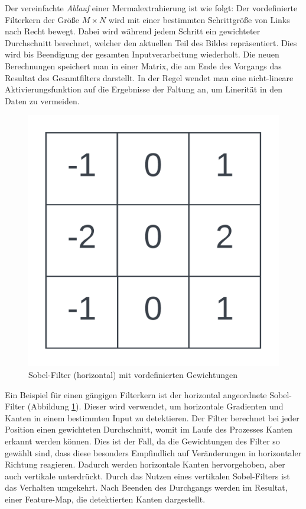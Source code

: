 Der vereinfachte \textit{Ablauf} einer Mermalextrahierung ist wie folgt: Der vordefinierte Filterkern der Größe $M \times N$ wird mit einer bestimmten Schrittgröße von Links nach Recht bewegt. Dabei wird während jedem Schritt ein gewichteter Durchschnitt berechnet, welcher den aktuellen Teil des Bildes repräsentiert. Dies wird bis Beendigung der gesamten Inputverarbeitung wiederholt. Die neuen Berechnungen speichert man in einer Matrix, die am Ende des Vorgangs das Resultat des Gesamtfilters darstellt. In der Regel wendet man eine nicht-lineare Aktivierungsfunktion auf die Ergebnisse der Faltung an, um Linerität in den Daten zu vermeiden.
\begin{figure}[H]
	\centering
	\includegraphics[width=0.2\linewidth]{Bilder/sobelfilter.png}
	\caption{Sobel-Filter (horizontal) mit vordefinierten Gewichtungen}
	\label{img:sobel}
\end{figure}
Ein Beispiel für einen gängigen Filterkern ist der horizontal angeordnete Sobel-Filter (Abbildung \ref{img:sobel}). Dieser wird verwendet, um horizontale Gradienten und Kanten in einem bestimmten Input zu detektieren. Der Filter berechnet bei jeder Position einen gewichteten Durchschnitt, womit im Laufe des Prozesses Kanten erkannt werden können. Dies ist der Fall, da die Gewichtungen des Filter so gewählt sind, dass diese besonders Empfindlich auf Veränderungen in horizontaler Richtung reagieren. Dadurch werden horizontale Kanten hervorgehoben, aber auch vertikale unterdrückt. Durch das Nutzen eines vertikalen Sobel-Filters ist das Verhalten umgekehrt. Nach Beenden des Durchgangs werden im Resultat, einer Feature-Map, die detektierten Kanten dargestellt.